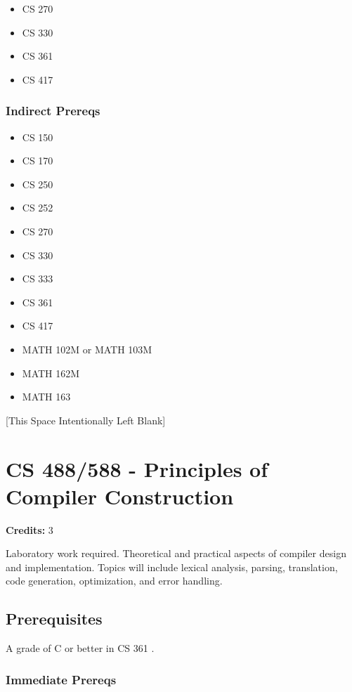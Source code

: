 \documentclass[]{article}
\providecommand{\tightlist}{%
  \setlength{\itemsep}{0pt}\setlength{\parskip}{0pt}}
\newcommand{\pagebreakhere}{
\vspace*{\fill}
\begin{center}
[This Space Intentionally Left Blank]
\end{center}
\vspace*{\fill}
\newpage
}
\begin{document}
\begin{itemize}
\tightlist
\item
  CS 270
\item
  CS 330
\item
  CS 361
\item
  CS 417
\end{itemize}

\subsubsection{Indirect Prereqs}\label{indirect-prereqs-41}

\begin{itemize}
\tightlist
\item
  CS 150
\item
  CS 170
\item
  CS 250
\item
  CS 252
\item
  CS 270
\item
  CS 330
\item
  CS 333
\item
  CS 361
\item
  CS 417
\item
  MATH 102M or MATH 103M
\item
  MATH 162M
\item
  MATH 163
\end{itemize}

\pagebreakhere
\section{CS 488/588 - Principles of Compiler
Construction}\label{cs-488588---principles-of-compiler-construction}

\textbf{Credits:} 3

Laboratory work required. Theoretical and practical aspects of compiler
design and implementation. Topics will include lexical analysis,
parsing, translation, code generation, optimization, and error handling.

\subsection{Prerequisites}\label{prerequisites-51}

A grade of C or better in CS 361 .

\subsubsection{Immediate Prereqs}\label{immediate-prereqs-42}
\end{document}
